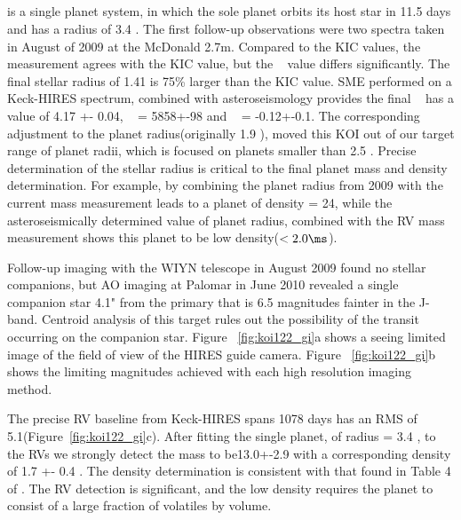 \documentclass{emulateapj}
\begin{document}


\subsection{\koionetwotwo} %

{\koionetwotwo} is a single planet system, in which the sole planet orbits its host star in 11.5 days and has a radius of 3.4 \rearthe. The first follow-up observations were two spectra taken in August of 2009 at the McDonald 2.7m. Compared to the KIC values, the \teff measurement agrees with the KIC value, but the \logg~ value differs significantly. The final stellar radius of 1.41 \rsun is 75\% larger than the KIC value.  SME performed on a Keck-HIRES spectrum, combined with asteroseismology \citep{Huber2013} provides the final \logg~ has a value of 4.17 +- 0.04,  \teff~ = 5858+-98 and \feh~ = -0.12+-0.1.  The corresponding adjustment to the planet radius(originally 1.9 \rearthe), moved this KOI out of our target range of planet radii, which is focused on planets smaller than 2.5 \rearthe. Precise determination of the stellar radius is critical  to the final planet mass and density determination. For example, by combining the planet radius from 2009  with the current mass measurement leads to a planet of density = 24\gcc, while the asteroseismically determined value of planet radius, combined with the RV mass measurement shows this planet to be low density($<2.0\ms$).

Follow-up imaging with the WIYN telescope in August 2009 found no stellar companions, but AO imaging at Palomar in June 2010 revealed a single companion star 4.1" from the primary that is 6.5 magnitudes fainter in the J-band. Centroid analysis of this target rules out the possibility of the transit occurring on the companion star. Figure ~\ref{fig:koi122_gi}a shows a seeing limited image of the field of view of the HIRES guide camera.  Figure ~\ref{fig:koi122_gi}b shows the limiting magnitudes achieved with each high resolution imaging method.  

The precise RV baseline from Keck-HIRES spans 1078 days has an RMS of 5.1\ms(Figure~\ref{fig:koi122_gi}c). After fitting the single planet, of radius = 3.4 \rearthe, to the RVs we strongly detect the mass  to be13.0+-2.9 \mearth with a corresponding density of 1.7 +- 0.4 \gcc .  The density determination is consistent with that found in Table 4 of \cite{Lopez2012}. The RV detection is significant, and the low density requires the planet to consist of a large fraction of volatiles by volume.
\end{document}
